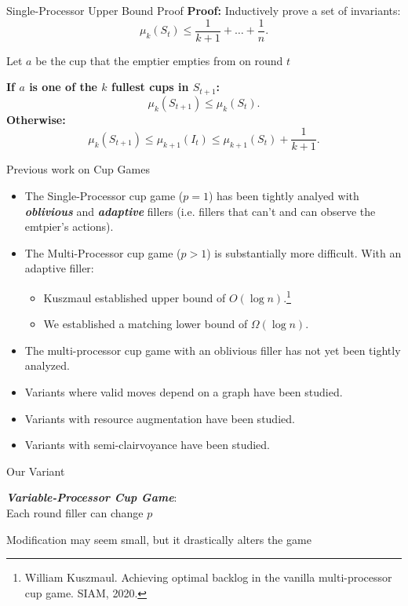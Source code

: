 \documentclass[xcolor=x11names, svgnames, rgb]{beamer}
\newcommand{\defn}[1]       {{\textit{\textbf{\boldmath #1}}}}
\begin{document}
\begin{frame}[t]{Single-Processor Upper Bound Proof}
  \textbf{Proof:}
  Inductively prove a set of invariants: 
    $$\mu_k(S_t) \le \frac{1}{k+1} + \ldots +\frac{1}{n}.$$

  \vspace{0.25cm}
  Let $a$ be the cup that the emptier empties from on round $t$

  \vspace{0.25cm}
  \textbf{If $a$ is one of the $k$ fullest cups in $S_{t+1}$:}
  $$\mu_k(S_{t+1}) \le \mu_k(S_t).$$
  \textbf{Otherwise:}
  $$\mu_k(S_{t+1}) \le \mu_{k+1}(I_t) \le \mu_{k+1}(S_{t}) + \frac{1}{k+1}.$$
\end{frame}

\begin{frame}[t]{Previous work on Cup Games}
  \begin{itemize}
    \item The Single-Processor cup game ($p=1$) has been tightly analyed with
      \defn{oblivious} and \defn{adaptive} fillers (i.e. fillers that can't and
      can observe the emtpier's actions).
    \item The Multi-Processor cup game ($p>1$) is substantially more difficult. With an adaptive filler:
      \begin{itemize}
        \item Kuszmaul established upper bound of $O(\log n)$.\footnote{\tiny\color{blue}William Kuszmaul. Achieving optimal backlog in the vanilla multi-processor cup game. SIAM, 2020.}
        \item We established a matching lower bound of $\Omega(\log n)$.
      \end{itemize}
    \item The multi-processor cup game with an oblivious filler has not yet
      been tightly analyzed.
    \item Variants where valid moves depend on a graph have been studied.
    \item Variants with resource augmentation have been studied.
    \item Variants with semi-clairvoyance have been studied.
  \end{itemize}
\end{frame}

\begin{frame}[t]{Our Variant}
  \begin{definition}
    \defn{Variable-Processor Cup Game}: \\
    Each round filler can change $p$ 
  \end{definition}

\vspace{1cm}
Modification may seem small, but it drastically alters the game

\end{frame}
\end{document}
